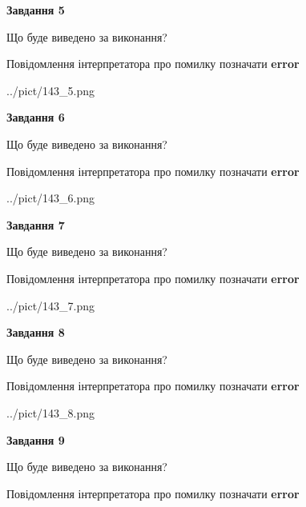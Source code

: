 \documentclass[11pt, ukrainian]{article}
\begin{document}
{\begin {large}
{\begin {center}\textbf{Завдання 5}\end {center}}\par
Що буде виведено за виконання? \par
Повідомлення інтерпретатора про помилку позначати \textbf{error}

\begin{center}
	{../pict/143_5.png}
\end{center}
\newpage

{\begin {center}\textbf{Завдання 6}\end {center}}\par
Що буде виведено за виконання? \par
Повідомлення інтерпретатора про помилку позначати \textbf{error}

\begin{center}
	{../pict/143_6.png}
\end{center}
\newpage

{\begin {center}\textbf{Завдання 7}\end {center}}\par
Що буде виведено за виконання? \par
Повідомлення інтерпретатора про помилку позначати \textbf{error}

\begin{center}
	{../pict/143_7.png}
\end{center}
\newpage

{\begin {center}\textbf{Завдання 8}\end {center}}\par
Що буде виведено за виконання? \par
Повідомлення інтерпретатора про помилку позначати \textbf{error}

\begin{center}
	{../pict/143_8.png}
\end{center}
\newpage

{\begin {center}\textbf{Завдання 9}\end {center}}\par
Що буде виведено за виконання? \par
Повідомлення інтерпретатора про помилку позначати \textbf{error}


\end{large}}
\end{document}
